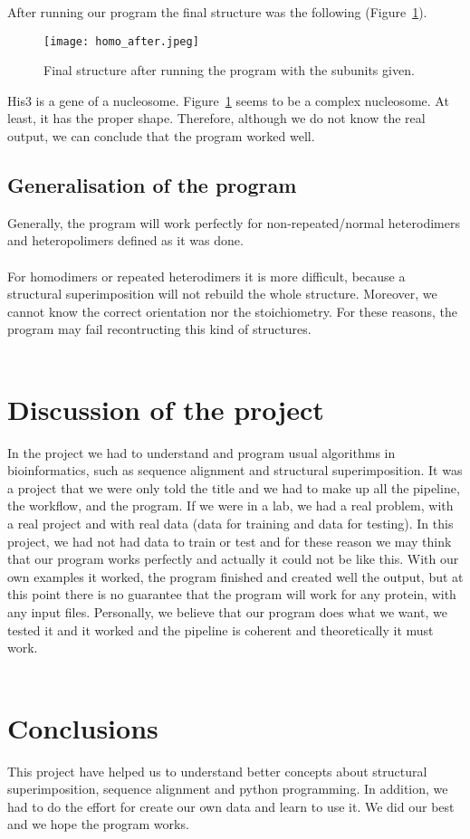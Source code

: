 \documentclass[a4paper,10pt]{report}
\begin{document}
\noindent
After running our program the final structure was the following (Figure~\ref{fig:4}).\\

\begin{figure}[h]
\centering
\texttt{[image: homo\_after.jpeg]}
\caption{Final structure after running the program with the subunits given.}
\label{fig:4}
\end{figure}

\noindent
His3 is a gene of a nucleosome. Figure~\ref{fig:4} seems to be a complex nucleosome. At least, it has the proper shape. Therefore, although we do not know the real output, we can conclude that the program worked well.\\



\section{Generalisation of the program}

Generally, the program will work perfectly for non-repeated/normal heterodimers and heteropolimers defined as it was done.\\\\
For homodimers or repeated heterodimers it is more difficult, because a structural superimposition will not rebuild the whole structure. Moreover, we cannot know the correct orientation nor the stoichiometry. For these reasons, the program may fail recontructing this kind of structures.\\\\



\chapter{Discussion of the project}

In the project we had to understand and program usual algorithms in bioinformatics, such as sequence alignment and structural superimposition. It was a project that we were only told the title and we had to make up all the pipeline, the workflow, and the program.
If we were in a lab, we had a real problem, with a real project and with real data (data for training and data for testing). In this project, we had not had data to train or test and for these reason we may think that our program works perfectly and actually it could not be like this. With our own examples it worked, the program finished and created well the output, but at this point there is no guarantee that the program will work for any protein, with any input files. Personally, we believe that our program does what we want, we tested it and it worked and the pipeline is coherent and theoretically it must work.\\\\

\chapter{Conclusions}

This project have helped us to understand better concepts about structural superimposition, sequence alignment and python programming. In addition, we had to do the effort for create our own data and learn to use it. We did our best and we hope the program works.
\end{document}
